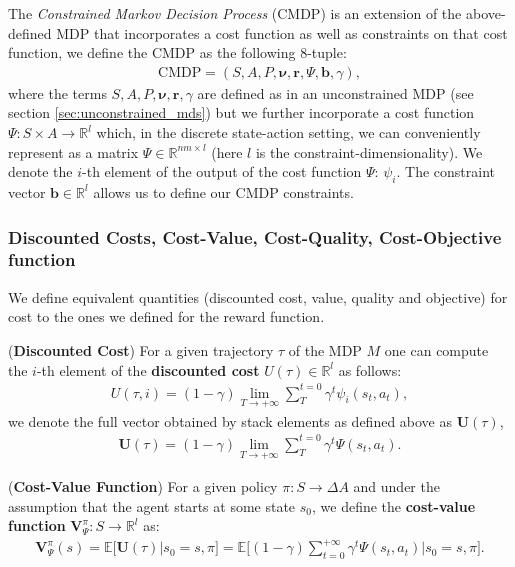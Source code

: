The \textit{Constrained Markov Decision Process} (CMDP) is an extension of the above-defined MDP that incorporates a cost function as well as constraints on that cost function, we define the CMDP as the following $8$-tuple:
\begin{align*}
    \text{CMDP} = (S,A,P,\bm{\nu},\bm{r},\Psi,\bm{b},\gamma),
\end{align*}
where the terms $S,A,P,\bm{\nu},\bm{r},\gamma$ are defined as in an unconstrained MDP (see section \ref{sec:unconstrained_mds}) but we further incorporate a cost function $\Psi:S\times A \rightarrow \mathbb{R}^{l}$ which, in the discrete state-action setting, we can conveniently represent as a matrix $\Psi\in\mathbb{R}^{nm \times l}$ (here $l$ is the constraint-dimensionality). We denote the $i$-th element of the output of the cost function $\Psi$: $\psi_i$. The constraint vector $\bm{b} \in \mathbb{R}^l$ allows us to define our CMDP constraints. 

\subsubsection{Discounted Costs, Cost-Value, Cost-Quality, Cost-Objective function}

We define equivalent quantities (discounted cost, value, quality and objective) for cost to the ones we defined for the reward function.

\begin{definition}
    (\textbf{Discounted Cost}) 
    For a given trajectory $\tau$ of the MDP $\textit{M}$ one can compute the $i$-th element of the \textbf{discounted cost} $U(\tau)\in\mathbb{R}^l$ as follows:
    \begin{align*}
        U(\tau,i) = (1-\gamma) \lim_{T \rightarrow + \infty} \sum_{T}^{t=0} \gamma^t \psi_i(s_t,a_t),
    \end{align*}
    we denote the full vector obtained by stack elements as defined above as $\bm{U}(\tau)$,
    \begin{align*}
        \bm{U}(\tau) =  (1-\gamma) \lim_{T \rightarrow + \infty}   \sum_{T}^{t=0} \gamma^t \Psi(s_t,a_t).
    \end{align*}
\end{definition}

\begin{definition}
    (\textbf{Cost-Value Function})
    For a given policy $\pi:S\rightarrow \Delta A$ and under the assumption that the agent starts at some state $s_0$, we define the \textbf{cost-value function} $\bm{V}_\Psi^\pi:S\rightarrow \mathbb{R}^l$ as:
    \begin{align*}
        \bm{V}_\Psi^\pi(s) = \mathbb{E}\Big[ \bm{U}(\tau) \Big| s_0  = s, \pi \Big] = \mathbb{E}\Bigg[  (1-\gamma) \sum_{t=0}^{+\infty} \gamma^t \Psi(s_t,a_t)  \Big| s_0  = s, \pi \Bigg].
    \end{align*}
\end{definition}

